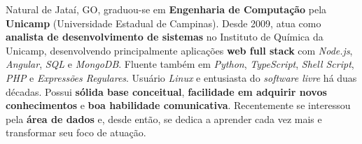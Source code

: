

\begin{cvparagraph}

Natural de Jataí, GO, graduou-se em \textbf{Engenharia de Computação} pela \textbf{Unicamp} (Universidade Estadual de Campinas). Desde 2009, atua como \textbf{analista de desenvolvimento de sistemas} no Instituto de Química da Unicamp, desenvolvendo principalmente aplicações \textbf{web full stack} com \textit{Node.js}, \textit{Angular}, \textit{SQL} e \textit{MongoDB}. Fluente também em \textit{Python}, \textit{TypeScript}, \textit{Shell Script}, \textit{PHP} e \textit{Expressões Regulares}. Usuário \textit{Linux} e entusiasta do \textit{software livre} há duas décadas. Possui \textbf{sólida base conceitual}, \textbf{facilidade em adquirir novos conhecimentos} e \textbf{boa habilidade comunicativa}. Recentemente se interessou pela \textbf{área de dados} e, desde então, se dedica a aprender cada vez mais e transformar seu foco de atuação.
\end{cvparagraph}
